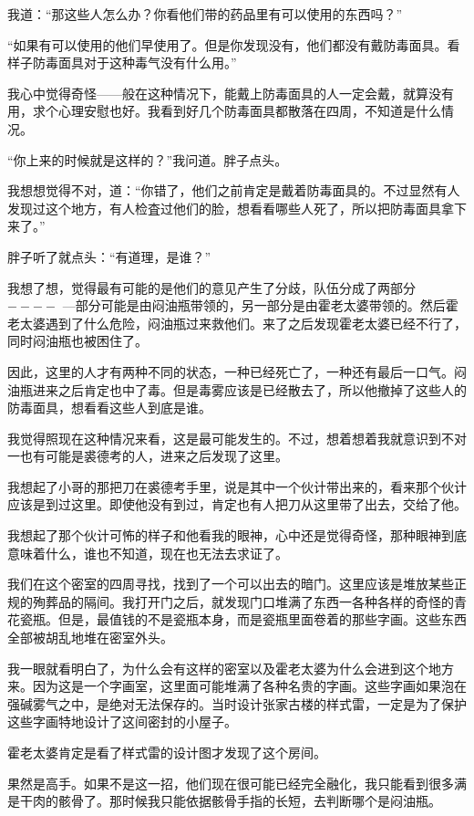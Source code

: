 我道：“那这些人怎么办？你看他们带的药品里有可以使用的东西吗？”

“如果有可以使用的他们早使用了。但是你发现没有，他们都没有戴防毒面具。看样子防毒面具对于这种毒气没有什么用。”

我心中觉得奇怪——般在这种情况下，能戴上防毒面具的人一定会戴，就算没有用，求个心理安慰也好。我看到好几个防毒面具都散落在四周，不知道是什么情况。

“你上来的时候就是这样的？”我问道。胖子点头。

我想想觉得不对，道：“你错了，他们之前肯定是戴着防毒面具的。不过显然有人发现过这个地方，有人检査过他们的脸，想看看哪些人死了，所以把防毒面具拿下来了。”

胖子听了就点头：“有道理，是谁？”

我想了想，觉得最有可能的是他们的意见产生了分歧，队伍分成了两部分$----$ —部分可能是由闷油瓶带领的，另一部分是由霍老太婆带领的。然后霍老太婆遇到了什么危险，闷油瓶过来救他们。来了之后发现霍老太婆已经不行了，同时闷油瓶也被困住了。

因此，这里的人才有两种不同的状态，一种已经死亡了，一种还有最后一口气。闷油瓶进来之后肯定也中了毒。但是毒雾应该是已经散去了，所以他撤掉了这些人的防毒面具，想看看这些人到底是谁。

我觉得照现在这种情况来看，这是最可能发生的。不过，想着想着我就意识到不对一也有可能是裘德考的人，进来之后发现了这里。

我想起了小哥的那把刀在裘德考手里，说是其中一个伙计带出来的，看来那个伙计应该是到过这里。即使他没有到过，肯定也有人把刀从这里带了出去，交给了他。

我想起了那个伙计可怖的样子和他看我的眼神，心中还是觉得奇怪，那种眼神到底意味着什么，谁也不知道，现在也无法去求证了。

我们在这个密室的四周寻找，找到了一个可以出去的暗门。这里应该是堆放某些正规的殉葬品的隔间。我打开门之后，就发现门口堆满了东西一各种各样的奇怪的青花瓷瓶。但是，最值钱的不是瓷瓶本身，而是瓷瓶里面卷着的那些字画。这些东西全部被胡乱地堆在密室外头。

我一眼就看明白了，为什么会有这样的密室以及霍老太婆为什么会进到这个地方来。因为这是一个字画室，这里面可能堆满了各种名贵的字画。这些字画如果泡在强碱雾气之中，是绝对无法保存的。当时设计张家古楼的样式雷，一定是为了保护这些字画特地设计了这间密封的小屋子。

霍老太婆肯定是看了样式雷的设计图才发现了这个房间。

果然是高手。如果不是这一招，他们现在很可能已经完全融化，我只能看到很多满是干肉的骸骨了。那时候我只能依据骸骨手指的长短，去判断哪个是闷油瓶。

